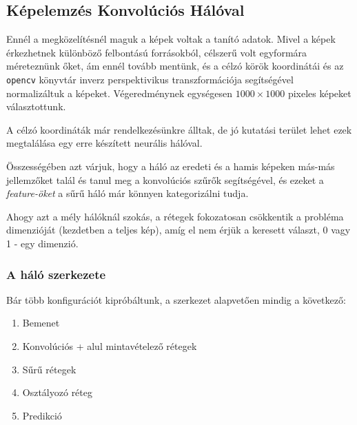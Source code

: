 %
%
%
%
%
%


\newpage
\subsection{Képelemzés Konvolúciós Hálóval}

Ennél a megközelítésnél maguk a képek voltak a tanító adatok.
Mivel a képek érkezhetnek különböző felbontású forrásokból, célszerű volt
egyformára méreteznünk őket, ám ennél tovább mentünk, és a célzó körök koordinátái 
és az \texttt{opencv} könyvtár inverz perspektivikus transzformációja segítségével 
normalizáltuk a képeket. Végeredménynek egységesen $ 1000 \times 1000 $ pixeles képeket
választottunk.

A célzó koordináták már rendelkezésünkre álltak, de jó kutatási terület lehet ezek 
megtalálása egy erre készített neurális hálóval.


Összességében azt várjuk, hogy a háló az eredeti és a hamis képeken más-más 
jellemzőket talál és tanul meg a konvolúciós szűrők segítségével, és ezeket
a \textit{feature-öket} a sűrű háló már könnyen kategorizálni tudja.

Ahogy azt a mély hálóknál szokás, a rétegek fokozatosan csökkentik a probléma
dimenzióját (kezdetben a teljes kép), amíg el nem érjük a keresett választ, 0 vagy 1 - 
egy dimenzió.

\subsubsection{A háló szerkezete}

Bár több konfigurációt kipróbáltunk, a szerkezet alapvetően mindig a következő:



\begin{enumerate} [itemsep=-1ex]
	\item Bemenet
	\item Konvolúciós + alul mintavételező rétegek
	\item Sűrű rétegek
	\item Osztályozó réteg
	\item Predikció
\end{enumerate}

